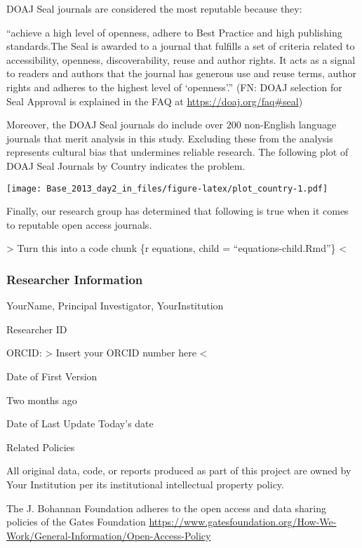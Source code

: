 \documentclass[]{article}
\begin{document}
DOAJ Seal journals are considered the most reputable because they:

``achieve a high level of openness, adhere to Best Practice and high
publishing standards.The Seal is awarded to a journal that fulfills a
set of criteria related to accessibility, openness, discoverability,
reuse and author rights. It acts as a signal to readers and authors that
the journal has generous use and reuse terms, author rights and adheres
to the highest level of `openness'.'' (FN: DOAJ selection for Seal
Approval is explained in the FAQ at \url{https://doaj.org/faq\#seal})

Moreover, the DOAJ Seal journals do include over 200 non-English
language journals that merit analysis in this study. Excluding these
from the analysis represents cultural bias that undermines reliable
research. The following plot of DOAJ Seal Journals by Country indicates
the problem.

\texttt{[image: Base\_2013\_day2\_in\_files/figure-latex/plot\_country-1.pdf]}

Finally, our research group has determined that following is true when
it comes to reputable open access journals.

\textbar{}\textbar{}\textgreater{} Turn this into a code chunk \{r
equations, child = ``equations-child.Rmd''\}
\textless{}\textbar{}\textbar{}

\subsubsection{Researcher Information}\label{researcher-information}

YourName, Principal Investigator, YourInstitution

Researcher ID

ORCID: \textbar{}\textbar{}\textgreater{} Insert your ORCID number here
\textless{}\textbar{}\textbar{}

Date of First Version

Two months ago

Date of Last Update Today's date

Related Policies

All original data, code, or reports produced as part of this project are
owned by Your Institution per its institutional intellectual property
policy.

The J. Bohannan Foundation adheres to the open access and data sharing
policies of the Gates Foundation
\url{https://www.gatesfoundation.org/How-We-Work/General-Information/Open-Access-Policy}
\end{document}
